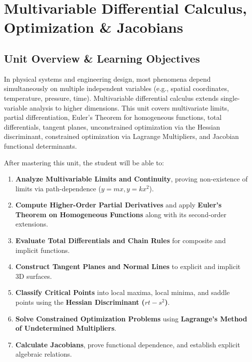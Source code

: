 \chapter{Multivariable Differential Calculus, Optimization \& Jacobians}
\label{chap:multivariable-differential-calculus}

\section{Unit Overview \& Learning Objectives}

In physical systems and engineering design, most phenomena depend simultaneously on multiple independent variables (e.g., spatial coordinates, temperature, pressure, time). Multivariable differential calculus extends single-variable analysis to higher dimensions. This unit covers multivariate limits, partial differentiation, Euler's Theorem for homogeneous functions, total differentials, tangent planes, unconstrained optimization via the Hessian discriminant, constrained optimization via Lagrange Multipliers, and Jacobian functional determinants.

\begin{important}
After mastering this unit, the student will be able to:
\begin{enumerate}[leftmargin=1.5em]
    \item \textbf{Analyze Multivariable Limits and Continuity}, proving non-existence of limits via path-dependence ($y = mx, y = kx^2$).
    \item \textbf{Compute Higher-Order Partial Derivatives} and apply \textbf{Euler's Theorem on Homogeneous Functions} along with its second-order extensions.
    \item \textbf{Evaluate Total Differentials and Chain Rules} for composite and implicit functions.
    \item \textbf{Construct Tangent Planes and Normal Lines} to explicit and implicit 3D surfaces.
    \item \textbf{Classify Critical Points} into local maxima, local minima, and saddle points using the \textbf{Hessian Discriminant ($rt - s^2$)}.
    \item \textbf{Solve Constrained Optimization Problems} using \textbf{Lagrange's Method of Undetermined Multipliers}.
    \item \textbf{Calculate Jacobians}, prove functional dependence, and establish explicit algebraic relations.
\end{enumerate}
\end{important}

